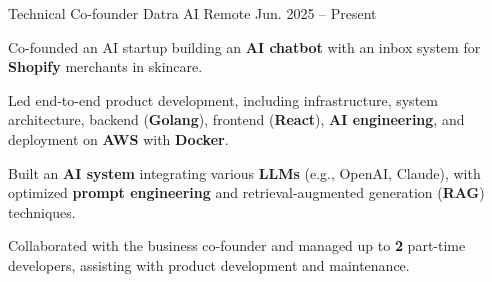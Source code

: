
\begin{cventries}

    \cventry
    {Technical Co-founder} %
    {Datra AI} %
    {Remote} %
  {Jun. 2025 -- Present} %
    {
      \begin{cvitems} %
    \item {Co-founded an AI startup building an \textbf{AI chatbot} with an inbox system for \textbf{Shopify} merchants in skincare.}
    \item {Led end-to-end product development, including infrastructure, system architecture, backend (\textbf{Golang}), frontend (\textbf{React}), \textbf{AI engineering}, and deployment on \textbf{AWS} with \textbf{Docker}.}
    \item {Built an \textbf{AI system} integrating various \textbf{LLMs} (e.g., OpenAI, Claude), with optimized \textbf{prompt engineering} and retrieval-augmented generation (\textbf{RAG}) techniques.}
    \item {Collaborated with the business co-founder and managed up to \textbf{2} part-time developers, assisting with product development and maintenance.}
      \end{cvitems}
    }

    \vspace{2mm}


\end{cventries}
